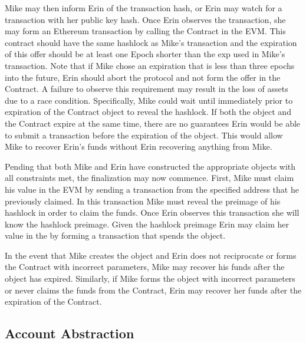 Mike may then inform Erin of the transaction hash, or Erin may watch
for a transaction with her public key hash.
Once Erin observes the transaction, she may form an Ethereum
transaction by calling the \AtomicSwap{}Contract in the EVM.
This contract should have the same hashlock as Mike's transaction and
the expiration of this offer should be at least one Epoch shorter than
the exp used in Mike's transaction.
Note that if Mike chose an expiration that is less than three epochs
into the future, Erin should abort the protocol and not form the offer
in the \AtomicSwap{}Contract.
A failure to observe this requirement may result in the loss of assets
due to a race condition.
Specifically, Mike could wait until immediately prior to expiration of
the \AtomicSwap{}Contract object to reveal the hashlock.
If both the \AtomicSwap{} object and the \AtomicSwap{}Contract expire at the
same time, there are no guarantees Erin would be able to submit a
transaction before the expiration of the \AtomicSwap{} object.
This would allow Mike to recover Erin's funds without Erin recovering
anything from Mike.

Pending that both Mike and Erin have constructed the appropriate
objects with all constraints met, the finalization may now commence.
First, Mike must claim his value in the EVM by sending a transaction
from the specified address that he previously claimed.
In this transaction Mike must reveal the preimage of his hashlock in
order to claim the funds.
Once Erin observes this transaction she will know the hashlock preimage.
Given the hashlock preimage Erin may claim her value in the \LayerTwoLong{}
by forming a transaction that spends the \AtomicSwap{} object.

In the event that Mike creates the \AtomicSwap{} object and Erin does not
reciprocate or forms the \AtomicSwap{}Contract with incorrect parameters,
Mike may recover his funds after the \AtomicSwap{} object has expired.
Similarly, if Mike forms the \AtomicSwap{} object with incorrect
parameters or never claims the funds from the \AtomicSwap{}Contract, Erin
may recover her funds after the expiration of the \AtomicSwap{}Contract.


\subsection{Account Abstraction}


